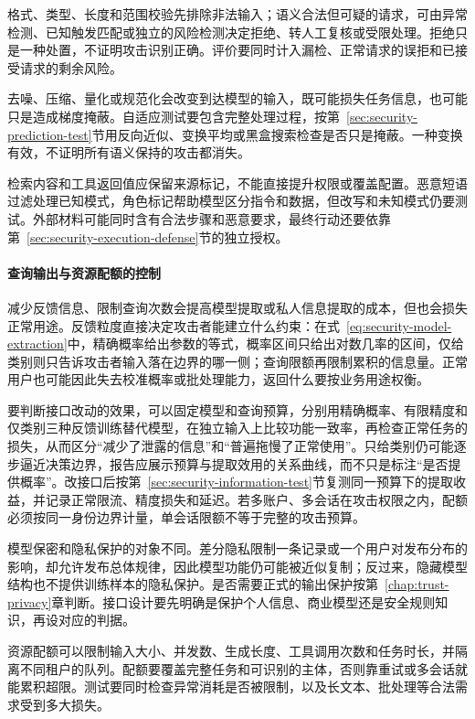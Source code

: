 格式、类型、长度和范围校验先排除非法输入；语义合法但可疑的请求，可由异常检测、已知触发匹配或独立的风险检测决定拒绝、转人工复核或受限处理。拒绝只是一种处置，不证明攻击识别正确。评价要同时计入漏检、正常请求的误拒和已接受请求的剩余风险。

去噪、压缩、量化或规范化会改变到达模型的输入，既可能损失任务信息，也可能只是造成梯度掩蔽。自适应测试要包含完整处理过程，按第~\ref{sec:security-prediction-test}节用反向近似、变换平均或黑盒搜索检查是否只是掩蔽。一种变换有效，不证明所有语义保持的攻击都消失。

检索内容和工具返回值应保留来源标记，不能直接提升权限或覆盖配置。恶意短语过滤处理已知模式，角色标记帮助模型区分指令和数据，但改写和未知模式仍要测试。外部材料可能同时含有合法步骤和恶意要求，最终行动还要依靠第~\ref{sec:security-execution-defense}节的独立授权。

\paragraph{查询输出与资源配额的控制}

减少反馈信息、限制查询次数会提高模型提取或私人信息提取的成本，但也会损失正常用途。反馈粒度直接决定攻击者能建立什么约束：在式~\eqref{eq:security-model-extraction}中，精确概率给出参数的等式，概率区间只给出对数几率的区间，仅给类别则只告诉攻击者输入落在边界的哪一侧；查询限额再限制累积的信息量。正常用户也可能因此失去校准概率或批处理能力，返回什么要按业务用途权衡。

要判断接口改动的效果，可以固定模型和查询预算，分别用精确概率、有限精度和仅类别三种反馈训练替代模型，在独立输入上比较功能一致率，再检查正常任务的损失，从而区分“减少了泄露的信息”和“普遍拖慢了正常使用”。只给类别仍可能逐步逼近决策边界，报告应展示预算与提取效用的关系曲线，而不只是标注“是否提供概率”。改接口后按第~\ref{sec:security-information-test}节复测同一预算下的提取收益，并记录正常限流、精度损失和延迟。若多账户、多会话在攻击权限之内，配额必须按同一身份边界计量，单会话限额不等于完整的攻击预算。

模型保密和隐私保护的对象不同。差分隐私限制一条记录或一个用户对发布分布的影响，却允许发布总体规律，因此模型功能仍可能被近似复制；反过来，隐藏模型结构也不提供训练样本的隐私保护。是否需要正式的输出保护按第~\ref{chap:trust-privacy}章判断。接口设计要先明确是保护个人信息、商业模型还是安全规则知识，再设对应的判据。

资源配额可以限制输入大小、并发数、生成长度、工具调用次数和任务时长，并隔离不同租户的队列。配额要覆盖完整任务和可识别的主体，否则靠重试或多会话就能累积超限。测试要同时检查异常消耗是否被限制，以及长文本、批处理等合法需求受到多大损失。

